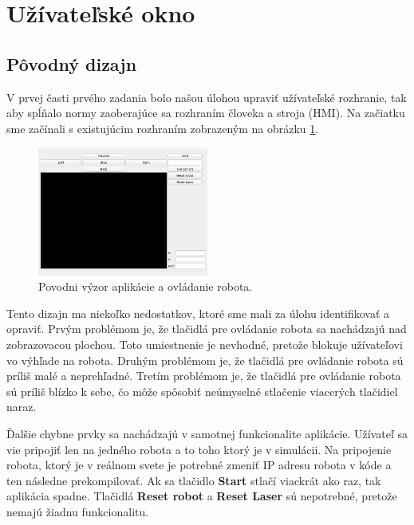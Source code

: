 \section{Užívateľské okno}

\subsection{Pôvodný dizajn}

V prvej časti prvého zadania bolo našou úlohou upraviť užívateľské rozhranie, tak aby spĺňalo normy zaoberajúce sa
rozhraním človeka a stroja (HMI). Na začiatku sme začínali s existujúcim rozhraním zobrazeným na obrázku \ref{fig:oldUI}.

\begin{figure}[!htbp]
	\begin{center}
		\includegraphics[width=0.5\textwidth]{img/oldUI.png}
	\end{center}
	\caption{Povodni výzor aplikácie a ovládanie robota.}\label{fig:oldUI}
\end{figure}

Tento dizajn ma niekoľko nedostatkov, ktoré sme mali za úlohu identifikovať a opraviť. Prvým problémom je,
že tlačidlá pre ovládanie robota sa nachádzajú nad zobrazovacou plochou. Toto umiestnenie je nevhodné, pretože
blokuje užívateľovi vo výhľade na robota. Druhým problémom je, že tlačidlá pre ovládanie robota sú príliš malé a
neprehľadné. Tretím problémom je, že tlačidlá pre ovládanie robota sú príliš blízko k sebe, čo môže spôsobiť
neúmyselné stlačenie viacerých tlačidiel naraz.

Ďalšie chybne prvky sa nachádzajú v samotnej funkcionalite aplikácie. Užívateľ sa vie pripojiť len na jedného robota
a to toho ktorý je v simulácii. Na pripojenie robota, ktorý je v reálnom svete je potrebné zmeniť IP adresu robota v kóde
a ten následne prekompilovať. Ak sa tlačidlo \textbf{Start} stlačí viackrát ako raz, tak aplikácia spadne. Tlačidlá
\textbf{Reset robot} a \textbf{Reset Laser} sú nepotrebné, pretože nemajú žiadnu funkcionalitu.

